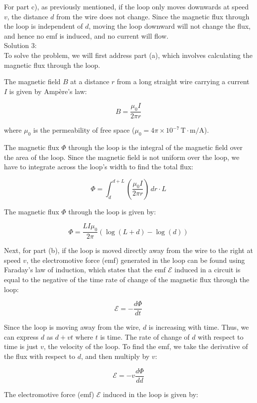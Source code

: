 \documentclass[a4paper,11pt]{article}
\begin{document}
For part c), as previously mentioned, if the loop only moves downwards at speed $v$, the distance $d$ from the wire does not change. Since the magnetic flux through the loop is independent of $d$, moving the loop downward will not change the flux, and hence no emf is induced, and no current will flow. \\

Solution 3: \\ 

To solve the problem, we will first address part (a), which involves calculating the magnetic flux through the loop.

The magnetic field \( B \) at a distance \( r \) from a long straight wire carrying a current \( I \) is given by Ampère's law:

\[
B = \frac{\mu_0 I}{2\pi r}
\]

where \( \mu_0 \) is the permeability of free space (\( \mu_0 = 4\pi \times 10^{-7} \, \text{T} \cdot \text{m/A} \)).

The magnetic flux \( \Phi \) through the loop is the integral of the magnetic field over the area of the loop. Since the magnetic field is not uniform over the loop, we have to integrate across the loop's width to find the total flux:

\[
\Phi = \int_{d}^{d+L} \left( \frac{\mu_0 I}{2\pi r} \right) \, dr \cdot L
\]

The magnetic flux \( \Phi \) through the loop is given by:

\[
\Phi = \frac{L I \mu_0}{2\pi} \left( \log(L + d) - \log(d) \right)
\]

Next, for part (b), if the loop is moved directly away from the wire to the right at speed \( v \), the electromotive force (emf) generated in the loop can be found using Faraday's law of induction, which states that the emf \( \mathcal{E} \) induced in a circuit is equal to the negative of the time rate of change of the magnetic flux through the loop:

\[
\mathcal{E} = -\frac{d\Phi}{dt}
\]

Since the loop is moving away from the wire, \( d \) is increasing with time. Thus, we can express \( d \) as \( d + vt \) where \( t \) is time. The rate of change of \( d \) with respect to time is just \( v \), the velocity of the loop. To find the emf, we take the derivative of the flux with respect to \( d \), and then multiply by \( v \):

\[
\mathcal{E} = -v \frac{d\Phi}{dd}
\]

The electromotive force (emf) \(\mathcal{E}\) induced in the loop is given by:
\end{document}
